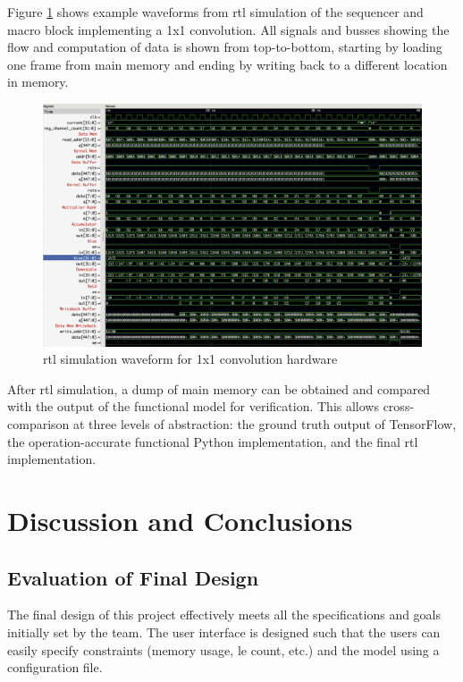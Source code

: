 \documentclass{uw-ece-wkrpt}
\begin{document}
Figure \ref{fig:rtl_simulation_waveform} shows example waveforms from \gls{rtl} simulation of the sequencer and macro block implementing a 1x1 convolution. All signals and busses showing the flow and computation of data is shown from top-to-bottom, starting by loading one frame from main memory and ending by writing back to a different location in memory.

\begin{figure}
\centering
\includegraphics[width=\textwidth]{figures/rtl_simulation_waveform}
\caption{\Gls{rtl} simulation waveform for 1x1 convolution hardware}\label{fig:rtl_simulation_waveform}
\end{figure}

After \gls{rtl} simulation, a dump of main memory can be obtained and compared with the output of the functional model for verification. This allows cross-comparison at three levels of abstraction: the ground truth output of TensorFlow, the operation-accurate functional Python implementation, and the final \gls{rtl} implementation.

\section{Discussion and Conclusions}

\subsection{Evaluation of Final Design}

The final design of this project effectively meets all the specifications and goals initially set by the team. The user interface is designed such that the users can easily specify constraints (memory usage, \gls{le} count, etc.) and the model using a configuration file.
\end{document}
